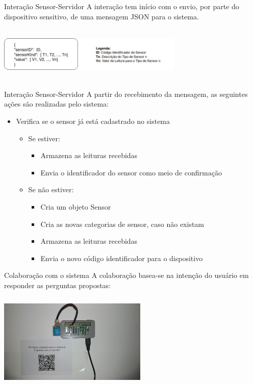 \documentclass{beamer}
\begin{document}
    \begin{frame}{Interação Sensor-Servidor}
      \quad A interação tem início com o envio, por parte do dispositivo sensitivo, de uma mensagem JSON para o sistema.
      \begin{center}
      \includegraphics[height=75pt, width=250pt]{mensagemJSON}
      \end{center}
    \end{frame}
    \begin{frame}{Interação Sensor-Servidor}
      \quad A partir do recebimento da mensagem, as seguintes ações são realizadas pelo sistema:
      \begin{itemize}
        \item Verifica se o sensor já está cadastrado no sistema
          \begin{itemize}
            \item Se estiver:
            \begin{itemize}
              \item Armazena as leituras recebidas
              \item Envia o identificador do sensor como meio de confirmação
            \end{itemize}
            \item Se não estiver:
            \begin{itemize}
              \item Cria um objeto Sensor
              \item Cria as novas categorias de sensor, caso não existam
              \item Armazena as leituras recebidas
              \item Envia o novo código identificador para o dispositivo
            \end{itemize}
          \end{itemize}
      \end{itemize}
    \end{frame}

    \begin{frame}{Colaboração com o sistema}
      \quad A colaboração basea-se na intenção do usuário em responder as perguntas propostas:
      \begin{center}
      \includegraphics[height=130pt, width=200pt]{sensormsg}
      \end{center}
    \end{frame}
\end{document}
